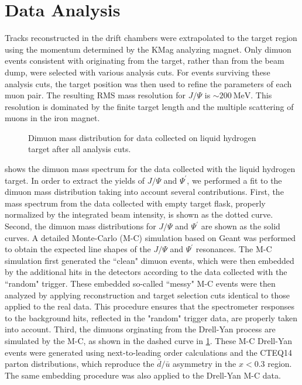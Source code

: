 \documentclass[twocolumn,aps,unsortedaddress,superscriptaddress,prd,floatfix,showpacs,linenumbers]{revtex4-2}
\begin{document}
\section{Data Analysis}
\label{sec:analysis}
Tracks reconstructed in the drift chambers were extrapolated
to the target region using the momentum determined by
the KMag analyzing magnet. Only dimuon events consistent with originating
from the target, rather than from the beam dump, were selected with various
analysis cuts. For events surviving these analysis cuts, the target
position was then used to
refine the parameters of each muon pair. The resulting
RMS mass resolution for $J/\Psi$ is $\sim\SI{200}{\MeV}$.
This resolution is dominated by the finite target length and the
multiple scattering of muons in the iron magnet.

\begin{figure}
	\caption{Dimuon mass distribution for data collected on liquid hydrogen target
		after all analysis cuts.}
	\label{fig:massfit_LH2}
\end{figure}
 shows the dimuon mass spectrum for the data collected with the
liquid hydrogen target. In order to extract the yields of $J/\Psi$ and
$\Psi^\prime$, we performed a fit to the dimuon mass distribution taking
into account several contributions. First, the mass spectrum from the
data collected with empty target flask, properly normalized by the
integrated beam intensity, is shown as the dotted curve. Second, the 
dimuon mass distributions for $J/\Psi$ and $\Psi^\prime$ are shown as
the solid curves. A detailed Monte-Carlo (M-C) simulation based on Geant was
performed to obtain the expected line shapes of the $J/\Psi$ and $\Psi^\prime$
resonances. The M-C simulation first generated the ``clean" dimuon events,
which were then embedded by the additional hits in the detectors according to
the data collected with the ``random" trigger. These embedded 
so-called ``messy" M-C events were then analyzed by applying reconstruction
and target selection cuts identical to those applied to the real data. This
procedure ensures that the spectrometer responses to the background hits, 
reflected in the "random" trigger data, are properly taken into account.
Third, the dimuons orginating from the Drell-Yan process are simulated
by the M-C, as shown in the dashed curve in \cref{fig:massfit_LH2}. These M-C
Drell-Yan events were generated using next-to-leading order
calculations and the CTEQ14 parton distributions,
which reproduce the $\bar{d}/ \bar{u}$ asymmetry in the $x < 0.3$ region.
The same embedding procedure was also applied to the Drell-Yan M-C data.
\end{document}
